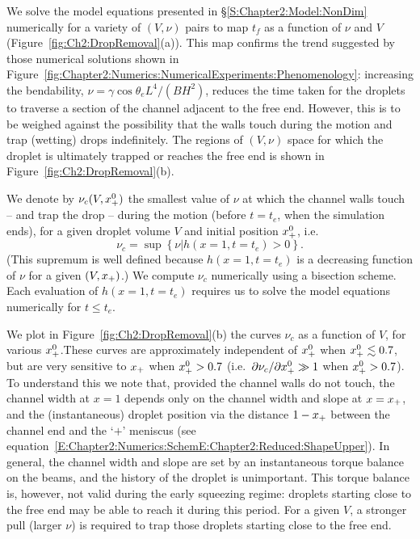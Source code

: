 We solve the model equations presented in \S\ref{S:Chapter2:Model:NonDim} numerically for a variety of $(V, \nu)$ pairs to map $t_f$ as a function of $\nu$ and $V$ (Figure~\ref{fig:Ch2:DropRemoval}(a)). This map confirms the trend suggested by those numerical solutions shown in Figure~\ref{fig:Chapter2:Numerics:NumericalExperiments:Phenomenology}: increasing the  bendability, $\nu = \gamma \cos \theta_e L^4/(BH^2)$, reduces the time taken for the droplets to traverse a section of the channel adjacent to the free end. However, this is to be weighed against the possibility that the walls touch during the motion and trap (wetting) drops indefinitely. The regions of $(V, \nu)$ space for which the droplet is ultimately trapped or reaches the free end is shown in Figure~\ref{fig:Ch2:DropRemoval}(b). %

We denote by $\nu_c(V,x_{+}^0)$ the smallest value of $\nu$ at which the channel walls touch -- and trap the drop -- during the motion (before $t = t_e$, when the simulation ends), for a given  droplet volume $V$ and initial position $x_{+}^0$, i.e.
\begin{equation}
\nu_c = \sup\left\{\nu | h(x = 1, t = t_e) > 0\right\}.
\end{equation}
(This supremum is well defined because $h(x = 1, t = t_e)$ is a decreasing function of $\nu$ for a given $(V, x_{+})$.) We compute $\nu_c$ numerically using a bisection scheme. Each evaluation of $h(x = 1, t = t_{e})$ requires us to solve the model equations numerically for $t \leq t_e$.

We plot in Figure~\ref{fig:Ch2:DropRemoval}(b) the curves $\nu_c$ as a function of $V$, for various $x_{+}^0$.These curves are approximately independent of $x_{+}^0$ when $x_{+}^0 \lesssim 0.7$, but are very sensitive to $x_{+}$ when $x_{+}^0>0.7$ (i.e.~$\partial \nu_c /\partial x_{+}^0 \gg 1$ when $x_{+}^0>0.7$). To understand this we note that, provided the channel walls do not touch, the channel width at $x = 1$ depends only on the channel width and slope at $x = x_{+}$, and the (instantaneous) droplet position via the distance $1 - x_{+}$ between the channel end and the `$+$' meniscus (see equation~\eqref{E:Chapter2:Numerics:SchemE:Chapter2:Reduced:ShapeUpper}).  In general, the channel width and slope are set by an instantaneous torque balance on the beams, and the history of the droplet is unimportant. This torque balance is, however, not valid during the early squeezing regime: droplets starting close to the free end may be able to reach it during this period. For a given $V$, a stronger pull (larger $\nu$) is required to trap those droplets starting close to the free end.

